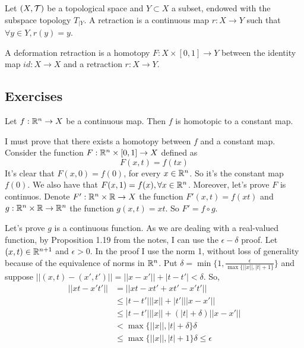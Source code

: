 \begin{definition}
    Let $(X, \mathcal{T})$ be a topological space and $Y \subset X$ a subset, endowed
    with the subspace topology $T_{|Y}$. A retraction is a continuous map $r :
    X \to Y$ such that $\forall y \in Y, r(y) = y$. 
    
    A deformation retraction is a homotopy $F : X \times [0, 1] \to Y$ between
    the identity map $id: X \to X$ and a retraction $r : X \to Y$.
\end{definition}

\subsection{Exercises}

\begin{exercise}
    Let $f : \mathbb{R}^n \to X$ be a continuous map. Then $f$ is homotopic to a constant map.
\end{exercise}

I must prove that there exists a homotopy between $f$ and a constant map.
Consider the function $F : \mathbb{R}^n \times [0,1] \to X$ defined as 
$$
F(x,t) = f(tx) 
$$
It's clear that $F(x,0) = f(0)$, for every $x \in \mathbb{R}^n$. So it's the constant
map $f(0)$. We also have that $F(x,1) = f(x), \forall x \in \mathbb{R}^n$. 
Moreover, let's prove $F$ is continuos. Denote $F' : \mathbb{R}^n \times \mathbb{R} \to X$ the
function $F'(x,t) = f(xt)$ and $g: \mathbb{R}^n \times \mathbb{R} \to \mathbb{R}^n$ the function
$g(x,t) = xt$. So $F' = f \circ g$. 

Let's prove $g$ is a continuous function. As we are dealing with a real-valued
function, by Proposition 1.19 from the notes, I can use the $\epsilon-\delta$
proof. Let $(x,t) \in \mathbb{R}^{n+1}$ and $\epsilon > 0$. In the proof I use the
norm 1, without loss of generality because of the equivalence of norms in
$\mathbb{R}^n$. Put $\delta = \min\{1, \frac{\epsilon}{\max\{||x||, |t| + 1\}} \}$ and suppose $||(x,t) - (x',t')|| = ||x - x'|| + |t -
t'| < \delta$. So,
\begin{equation*}
    \begin{split}
        ||xt - x't'|| &= ||xt - xt' + xt' - x't'|| \\
        &\le |t - t'|||x|| + |t'|||x - x'|| \\
        &\le |t - t'|||x|| + (|t| + \delta)||x - x'|| \\
        &< \max\{||x||, |t| + \delta\}\delta \\
        &\le \max\{||x||, |t| + 1\}\delta \le \epsilon
    \end{split}
\end{equation*} 

